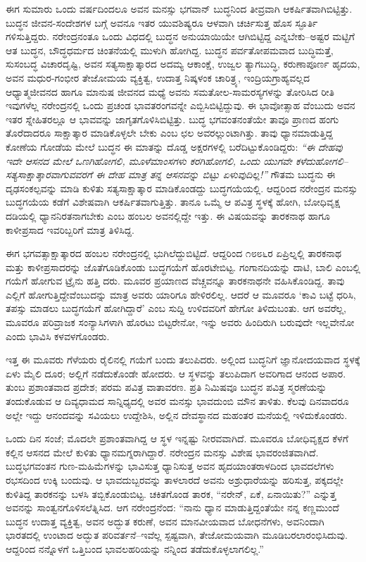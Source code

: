 ಈಗ ಸುಮಾರು ಒಂದು ವರ್ಷದಿಂದಲೂ ಅವನ ಮನಸ್ಸು ಭಗವಾನ್ ಬುದ್ಧನಿಂದ ತೀವ್ರವಾಗಿ ಆಕರ್ಷಿತವಾಗಿಬಿಟ್ಟಿತ್ತು. ಬುದ್ಧನ ಜೀವನ-ಸಂದೇಶಗಳ ಬಗ್ಗೆ ಅವನೂ ಇತರ ಯುವಶಿಷ್ಯರೂ ಆಳವಾಗಿ ಚರ್ಚಿಸುತ್ತ ಹೊಸ ಸ್ಫೂರ್ತಿ ಗಳಿಸುತ್ತಿದ್ದರು. ನರೇಂದ್ರನಂತೂ ಒಂದು ವಿಧದಲ್ಲಿ ಬುದ್ಧನ ಅನುಯಾಯಿಯೇ ಆಗಿಬಿಟ್ಟಿದ್ದ ಎನ್ನಬೇಕು–ಅಷ್ಟರ ಮಟ್ಟಿಗೆ ಆತ ಬುದ್ಧನ, ಬೌದ್ಧಧರ್ಮದ ಚಿಂತನೆಯಲ್ಲಿ ಮುಳುಗಿ ಹೋಗಿದ್ದ. ಬುದ್ಧನ ಪರ್ವತೋಪಮವಾದ ಬುದ್ಧಿಮತ್ತೆ, ಸುಸಂಬದ್ಧ ವಿಚಾರದೃಷ್ಟಿ, ಅವನ ಸತ್ಯಸಾಕ್ಷಾತ್ಕಾರದ ಅದಮ್ಯ ಆಕಾಂಕ್ಷೆ, ಉಜ್ವಲ ತ್ಯಾಗಬುದ್ಧಿ, ಕರುಣಾಪೂರ್ಣ ಹೃದಯ, ಅವನ ಮಧುರ-ಗಂಭೀರ ತೇಜೋಮಯ ವ್ಯಕ್ತಿತ್ವ, ಉದಾತ್ತ ನಿಷ್ಕಳಂಕ ಚಾರಿತ್ರ್ಯ, ಇಂದ್ರಿಯಗ್ರಾಹ್ಯವಲ್ಲದ ಆಧ್ಯಾತ್ಮಜೀವನದ ಹಾಗೂ ಮಾನುಷ ಜೀವನದ ಮಧ್ಯೆ ಅವನು ಸಮತೋಲ-ಸಾಮರಸ್ಯಗಳನ್ನು ತೋರಿಸಿದ ರೀತಿ ಇವುಗಳೆಲ್ಲ ನರೇಂದ್ರನಲ್ಲಿ ಒಂದು ಪ್ರಚಂಡ ಭಾವತರಂಗವನ್ನೇ ಎಬ್ಬಿಸಿಬಿಟ್ಟಿದ್ದುವು. ಈ ಭಾವೋತ್ಸಾಹ ವೆಂಬುದು ಅವನ ಇತರ ಸ್ನೇಹಿತರಲ್ಲೂ ಆ ಭಾವವನ್ನು ಜಾಗೃತಗೊಳಿಸಿಬಿಟ್ಟಿತ್ತು. ಬುದ್ಧ ಭಗವಂತನಂತೆಯೇ ತಾವೂ ಪ್ರಾಣದ ಹಂಗು ತೊರೆದಾದರೂ ಸಾಕ್ಷಾತ್ಕಾರ ಮಾಡಿಕೊಳ್ಳಲೇ ಬೇಕು ಎಂಬ ಛಲ ಅವರಲ್ಲುಂಟಾಗಿತ್ತು. ತಾವು ಧ್ಯಾನಮಾಡುತ್ತಿದ್ದ ಕೋಣೆಯ ಗೋಡೆಯ ಮೇಲೆ ಬುದ್ಧನ ಈ ಮಾತನ್ನು ದೊಡ್ಡ ಅಕ್ಷರಗಳಲ್ಲಿ ಬರೆದಿಟ್ಟುಕೊಂಡಿದ್ದರು: \textit{“ಈ ದೇಹವು ಇದೇ ಆಸನದ ಮೇಲೆ ಒಣಗಿಹೋಗಲಿ, ಮೂಳೆಮಾಂಸಗಳು ಕರಗಿಹೋಗಲಿ, ಒಂದು ಯುಗವೇ ಕಳೆದುಹೋಗಲಿ–ಸತ್ಯಸಾಕ್ಷಾತ್ಕಾರವಾಗುವವರಗೆ ಈ ದೇಹ ಮಾತ್ರ ತನ್ನ ಆಸನವನ್ನು ಬಿಟ್ಟು ಏಳುವುದಿಲ್ಲ!”} ಗೌತಮ ಬುದ್ಧನು ಈ ದೃಢಸಂಕಲ್ಪವನ್ನು ಮಾಡಿ ಕುಳಿತು ಸತ್ಯಸಾಕ್ಷಾತ್ಕಾರ ಮಾಡಿಕೊಂಡದ್ದು ಬುದ್ಧಗಯೆಯಲ್ಲಿ. ಆದ್ದರಿಂದ ನರೇಂದ್ರನ ಮನಸ್ಸು ಬುದ್ಧಗಯೆಯ ಕಡೆಗೆ ವಿಶೇಷವಾಗಿ ಆಕರ್ಷಿತವಾಗುತ್ತಿತ್ತು. ತಾನೂ ಒಮ್ಮೆ ಆ ಪವಿತ್ರ ಸ್ಥಳಕ್ಕೆ ಹೋಗಿ, ಬೋಧಿವೃಕ್ಷ ದಡಿಯಲ್ಲಿ ಧ್ಯಾನನಿರತನಾಗಬೇಕು ಎಂಬ ಹಂಬಲ ಅವನಲ್ಲಿದ್ದೇ ಇತ್ತು. ಈ ವಿಷಯವನ್ನು ತಾರಕನಾಥ ಹಾಗೂ ಕಾಳೀಪ್ರಸಾದ ಇವರಿಬ್ಬರಿಗೆ ಮಾತ್ರ ತಿಳಿಸಿದ್ದ.

ಈಗ ಭಗವತ್ಸಾಕ್ಷಾತ್ಕಾರದ ಹಂಬಲ ನರೇಂದ್ರನಲ್ಲಿ ಭುಗಿಲೆದ್ದುಬಿಟ್ಟಿದೆ. ಆದ್ದರಿಂದ ೧೮೮೬ರ ಏಪ್ರಿಲ್ನಲ್ಲಿ ತಾರಕನಾಥ ಮತ್ತು ಕಾಳೀಪ್ರಸಾದರನ್ನು ಜೊತೆಗೂಡಿಕೊಂಡು ಬುದ್ಧಗಯೆಗೆ ಹೊರಟೇಬಿಟ್ಟ. ಗಂಗಾನದಿಯನ್ನು ದಾಟಿ, ಬಾಲಿ ಎಂಬಲ್ಲಿ ಗಯೆಗೆ ಹೋಗುವ ಟ್ರೈನು ಹತ್ತಿ ದರು. ಮೂವರ ಪ್ರಯಾಣದ ವೆಚ್ಚವನ್ನೂ ತಾರಕನಾಥನೇ ವಹಿಸಿಕೊಂಡಿದ್ದ. ತಾವು ಎಲ್ಲಿಗೆ ಹೋಗುತ್ತಿದ್ದೇವೆಂಬುದನ್ನು ಮಾತ್ರ ಅವರು ಯಾರಿಗೂ ಹೇಳಿರಲಿಲ್ಲ. ಆದರೆ ಆ ಮೂವರೂ ‘ಕಾವಿ ಬಟ್ಟೆ ಧರಿಸಿ, ತಪಸ್ಸು ಮಾಡಲು ಬುದ್ಧಗಯೆಗೆ ಹೋಗಿದ್ದಾರೆ’ ಎಂಬ ಸುದ್ದಿ ಉಳಿದವರಿಗೆ ಹೇಗೋ ತಿಳಿದುಬಂತು. ಆಗ ಅವರೆಲ್ಲ, ಮೂವರೂ ಪರಿವ್ರಾಜಕ ಸಂನ್ಯಾಸಿಗಳಾಗಿ ಹೊರಟು ಬಿಟ್ಟರೇನೋ, ಇನ್ನು ಅವರು ಹಿಂದಿರುಗಿ ಬರುವುದೇ ಇಲ್ಲವೇನೋ ಎಂದು ಭಾವಿಸಿ ಕಳವಳಗೊಂಡರು.

ಇತ್ತ ಈ ಮೂವರು ಗೆಳೆಯರು ರೈಲಿನಲ್ಲಿ ಗಯೆಗೆ ಬಂದು ತಲುಪಿದರು. ಅಲ್ಲಿಂದ ಬುದ್ಧನಿಗೆ ಜ್ಞಾನೋದಯವಾದ ಸ್ಥಳಕ್ಕೆ ಏಳು ಮೈಲಿ ದೂರ; ಅಲ್ಲಿಗೆ ನಡೆದುಕೊಂಡೇ ಹೋದರು. ಆ ಸ್ಥಳವನ್ನು ತಲುಪಿದಾಗ ಅವರಿಗಾದ ಆನಂದ ಅಪಾರ. ತುಂಬ ಪ್ರಶಾಂತವಾದ ಪ್ರದೇಶ; ಪರಮ ಪವಿತ್ರ ವಾತಾವರಣ. ಪ್ರತಿ ನಿಮಿಷವೂ ಬುದ್ಧನ ಪವಿತ್ರ ಸ್ಮರಣೆಯನ್ನು ತಂದುಕೊಡುವ ಆ ದಿವ್ಯಧಾಮದ ಸಾನ್ನಿಧ್ಯದಲ್ಲಿ ಅವರ ಮನಸ್ಸು ಭಾವದುಂಬಿ ಮೌನ ತಾಳಿತು. ಕೆಲವು ದಿನವಾದರೂ ಅಲ್ಲೇ ಇದ್ದು ಆನಂದವನ್ನು ಸವಿಯಲು ಉದ್ದೇಶಿಸಿ, ಅಲ್ಲಿನ ದೇವಸ್ಥಾನದ ಮಹಂತರ ಮನೆಯಲ್ಲಿ ಇಳಿದುಕೊಂಡರು. 

ಒಂದು ದಿನ ಸಂಜೆ; ಮೊದಲೇ ಪ್ರಶಾಂತವಾಗಿದ್ದ ಆ ಸ್ಥಳ ಇನ್ನಷ್ಟು ನೀರವವಾಗಿದೆ. ಮೂವರೂ ಬೋಧಿವೃಕ್ಷದ ಕೆಳಗೆ ಕಲ್ಲಿನ ಆಸನದ ಮೇಲೆ ಕುಳಿತು ಧ್ಯಾನಮಗ್ನರಾಗಿದ್ದಾರೆ. ನರೇಂದ್ರನ ಮನಸ್ಸು ವಿಶೇಷ ಭಾವರಂಜಿತವಾಗಿದೆ. ಬುದ್ಧಭಗವಂತನ ಗುಣ-ಮಹಿಮೆಗಳನ್ನು ಭಾವಿಸುತ್ತ ಧ್ಯಾನಿಸುತ್ತ ಅವನ ಹೃದಯಾಂತರಾಳದಿಂದ ಭಾವದಲೆಗಳು ರಭಸದಿಂದ ಉಕ್ಕಿ ಬಂದುವು. ಆ ಭಾವದುಬ್ಬರವನ್ನು ತಾಳಲಾರದೆ ಅವನು ಅಶ್ರುಧಾರೆಯನ್ನು ಹರಿಸುತ್ತ, ಪಕ್ಕದಲ್ಲೇ ಕುಳಿತಿದ್ದ ತಾರಕನನ್ನು ಬಳಸಿ ತಬ್ಬಿಕೊಂಡುಬಿಟ್ಟ. ಚಕಿತಗೊಂಡ ತಾರಕ, “ನರೇನ್, ಏಕೆ, ಏನಾಯಿತು?” ಎನ್ನುತ್ತ ಅವನನ್ನು ಸಾಂತ್ವನಗೊಳಿಸಲೆತ್ನಿಸಿದ. ಆಗ ನರೇಂದ್ರನೆಂದ: “ನಾನು ಧ್ಯಾನ ಮಾಡುತ್ತಿದ್ದಂತೆಯೇ ನನ್ನ ಕಣ್ಣಮುಂದೆ ಬುದ್ಧನ ಉದಾತ್ತ ವ್ಯಕ್ತಿತ್ವ, ಅವನ ಅದ್ಭುತ ಕರುಣೆ, ಅವನ ಮಾನವೀಯವಾದ ಬೋಧನೆಗಳು, ಅವನಿಂದಾಗಿ ಭಾರತದಲ್ಲಿ ಉಂಟಾದ ಅದ್ಭುತ ಪರಿವರ್ತನೆ–ಇವೆಲ್ಲ ಸ್ಪಷ್ಟವಾಗಿ, ತೇಜೋಮಯವಾಗಿ ಮೂಡಿಬರಲಾರಂಭಿಸಿದುವು. ಆದ್ದರಿಂದ ನನ್ನೊಳಗೆ ಒತ್ತಿಬಂದ ಭಾವಲಹರಿಯನ್ನು ನನ್ನಿಂದ ತಡೆದುಕೊಳ್ಳಲಾಗಲಿಲ್ಲ.”

